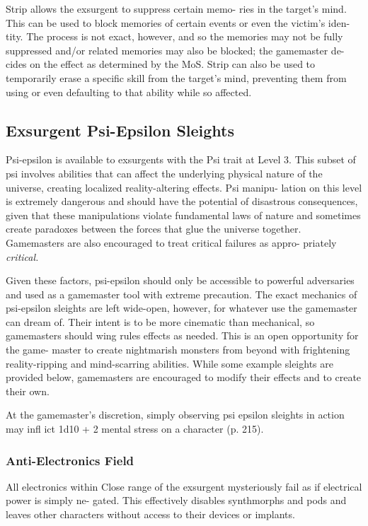 Strip allows the exsurgent to suppress certain memo-
ries in the target's mind. This can be used to block 
memories of certain events or even the victim's iden-
tity. The process is not exact, however, and so the 
memories may not be fully suppressed and/or related 
memories may also be blocked; the gamemaster de-
cides on the effect as determined by the MoS. Strip can 
also be used to temporarily erase a specific skill from 
the target's mind, preventing them from using or even 
defaulting to that ability while so affected.

\subsection{Exsurgent Psi-Epsilon Sleights }

Psi-epsilon is available to exsurgents with the Psi trait 
at Level 3. This subset of psi involves abilities that can 
affect the underlying physical nature of the universe, 
creating localized reality-altering effects. Psi manipu-
lation on this level is extremely dangerous and should 
have the potential of disastrous consequences, given 
that these manipulations violate fundamental laws of 
nature and sometimes create paradoxes between the 
forces that glue the universe together. Gamemasters 
are also encouraged to treat critical failures as appro-
priately \textit{critical.}

Given these factors, psi-epsilon should only be 
accessible to powerful adversaries and used as a 
gamemaster tool with extreme precaution. The exact 
mechanics of psi-epsilon sleights are left wide-open, 
however, for whatever use the gamemaster can 
dream of. Their intent is to be more cinematic than 
mechanical, so gamemasters should wing rules effects 
as needed. This is an open opportunity for the game-
master to create nightmarish monsters from beyond 
with frightening reality-ripping and mind-scarring 
abilities. While some example sleights are provided 
below, gamemasters are encouraged to modify their 
effects and to create their own. 

At the gamemaster's discretion, simply observing psi 
epsilon sleights in action may infl ict 1d10 + 2 mental 
stress on a character (p. 215).

\subsubsection{Anti-Electronics Field}

All electronics within Close range of the exsurgent 
mysteriously fail as if electrical power is simply ne-
gated. This effectively disables synthmorphs and pods 
and leaves other characters without access to their 
devices or implants.

